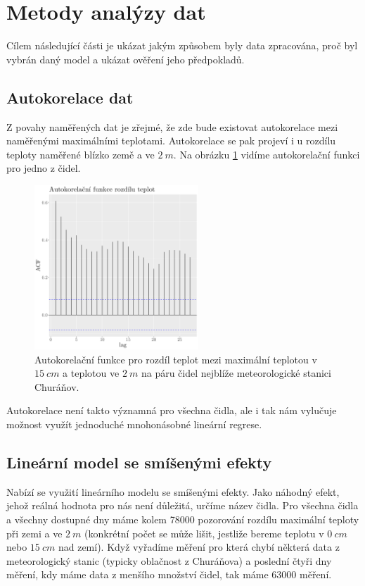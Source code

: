 \section{Metody analýzy dat}
Cílem následující části je ukázat jakým způsobem byly data zpracována, proč byl vybrán daný model a ukázat ověření jeho předpokladů.

\subsection{Autokorelace dat}
Z povahy naměřených dat je zřejmé, že zde bude existovat autokorelace mezi naměřenými maximálními teplotami. Autokorelace se pak projeví i u rozdílu teploty naměřené blízko země a ve $\SI{2}{m}$. Na obrázku \ref{fig:acf} vidíme autokorelační funkci pro jedno z čidel.

\begin{figure}
	\centering
	\includegraphics[width=0.55\textwidth]{img/ch2/acfNPS_4311_D_TMS.png}
	\caption{Autokorelační funkce pro rozdíl teplot mezi maximální teplotou v $\SI{15}{cm}$ a teplotou ve $\SI{2}{m}$ na páru čidel nejblíže meteorologické stanici Churáňov.}
	\label{fig:acf}
\end{figure}

Autokorelace není takto významná pro všechna čidla, ale i tak nám vylučuje možnost využít jednoduché mnohonásobné lineární regrese.

\subsection{Lineární model se smíšenými efekty}
Nabízí se využití lineárního modelu se smíšenými efekty. Jako náhodný efekt, jehož reálná hodnota pro nás není důležitá, určíme název čidla. Pro všechna čidla a všechny dostupné dny máme kolem 78000 pozorování rozdílu maximální teploty při zemi a ve $\SI{2}{m}$ (konkrétní počet se může lišit, jestliže bereme teplotu v $\SI{0}{cm}$ nebo $\SI{15}{cm}$ nad zemí). Když vyřadíme měření pro která chybí některá data z meteorologický stanic (typicky oblačnost z Churáňova) a poslední čtyři dny měření, kdy máme data z menšího množství čidel, tak máme 63000 měření.


